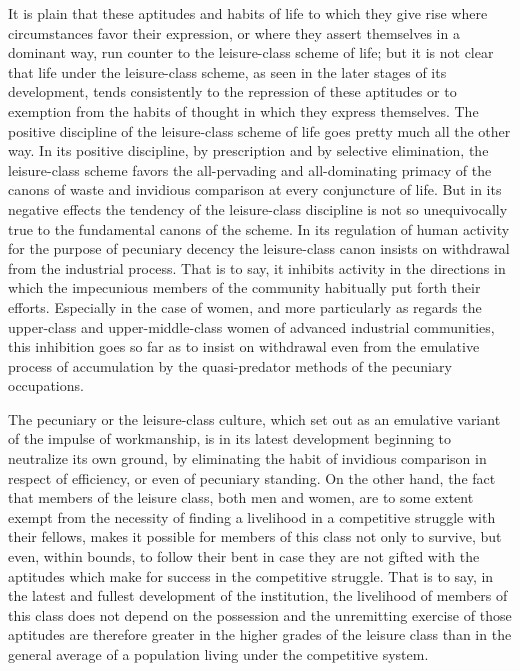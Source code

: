 \documentclass[12pt]{report}
\begin{document}
It is plain that these aptitudes and habits of life to which they give
rise where circumstances favor their expression, or where they assert
themselves in a dominant way, run counter to the leisure-class scheme of
life; but it is not clear that life under the leisure-class scheme, as
seen in the later stages of its development, tends consistently to the
repression of these aptitudes or to exemption from the habits of
thought in which they express themselves. The positive discipline of the
leisure-class scheme of life goes pretty much all the other way. In its
positive discipline, by prescription and by selective elimination, the
leisure-class scheme favors the all-pervading and all-dominating primacy
of the canons of waste and invidious comparison at every conjuncture
of life. But in its negative effects the tendency of the leisure-class
discipline is not so unequivocally true to the fundamental canons of the
scheme. In its regulation of human activity for the purpose of
pecuniary decency the leisure-class canon insists on withdrawal from
the industrial process. That is to say, it inhibits activity in the
directions in which the impecunious members of the community habitually
put forth their efforts. Especially in the case of women, and more
particularly as regards the upper-class and upper-middle-class women
of advanced industrial communities, this inhibition goes so far as to
insist on withdrawal even from the emulative process of accumulation by
the quasi-predator methods of the pecuniary occupations.

The pecuniary or the leisure-class culture, which set out as an
emulative variant of the impulse of workmanship, is in its latest
development beginning to neutralize its own ground, by eliminating
the habit of invidious comparison in respect of efficiency, or even
of pecuniary standing. On the other hand, the fact that members of the
leisure class, both men and women, are to some extent exempt from the
necessity of finding a livelihood in a competitive struggle with
their fellows, makes it possible for members of this class not only to
survive, but even, within bounds, to follow their bent in case they are
not gifted with the aptitudes which make for success in the competitive
struggle. That is to say, in the latest and fullest development of the
institution, the livelihood of members of this class does not depend
on the possession and the unremitting exercise of those aptitudes are
therefore greater in the higher grades of the leisure class than in the
general average of a population living under the competitive system.
\end{document}
